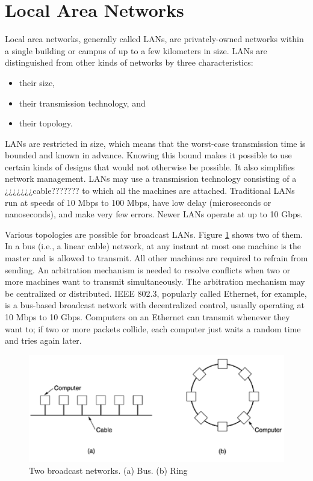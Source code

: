 \section{Local Area Networks}
Local area networks, generally called LANs, are privately-owned 
networks within a single building or campus of 
up to a few kilometers in size. LANs are 
distinguished from other kinds of networks by three  
characteristics:
  
\begin{itemize}
  \item their size, 
  \item their transmission technology, and
  \item their topology.  
\end{itemize}

LANs are restricted in size,  which means that the 
worst-case transmission time is bounded and known in 
advance. Knowing this bound makes it possible to use 
certain kinds of designs that would not otherwise 
be possible. It also simplifies network management. 
LANs may use a transmission technology consisting 
of a ¿¿¿¿¿¿¿cable??????? to which all the machines 
are attached. Traditional  LANs  run  at  
speeds  of  10  Mbps  to  100 
Mbps, have low delay (microseconds or nanoseconds), 
and make very few errors. Newer LANs operate at up to 
10 Gbps. 

Various topologies are possible for broadcast LANs. 
Figure \ref{fig:lan-networks-topologies-fig} shows 
two of them. In a 
bus (i.e., a linear cable) network, 
at any instant at most one machine is the master 
and is allowed to transmit. All other machines are 
required to refrain from sending. An arbitration 
mechanism is needed to resolve conflicts when two or more 
machines want to transmit simultaneously. The 
arbitration mechanism may be centralized or 
distributed. IEEE 802.3, popularly called Ethernet, 
for example, is a bus-based broadcast network with 
decentralized control, usually operating at 10 Mbps 
to 10 Gbps. Computers on an Ethernet can transmit 
whenever they want to; if two or more packets collide, 
each computer just waits a random time and tries again later. 


\begin{figure}
  \includegraphics[width=1.0\textwidth]{chapters/ch-networks/figures/lan-networks-topologies}
  \caption{Two broadcast networks. (a) Bus. (b) Ring \cite{Tanembaum:2003cn}}
  \label{fig:lan-networks-topologies-fig}
\end{figure}